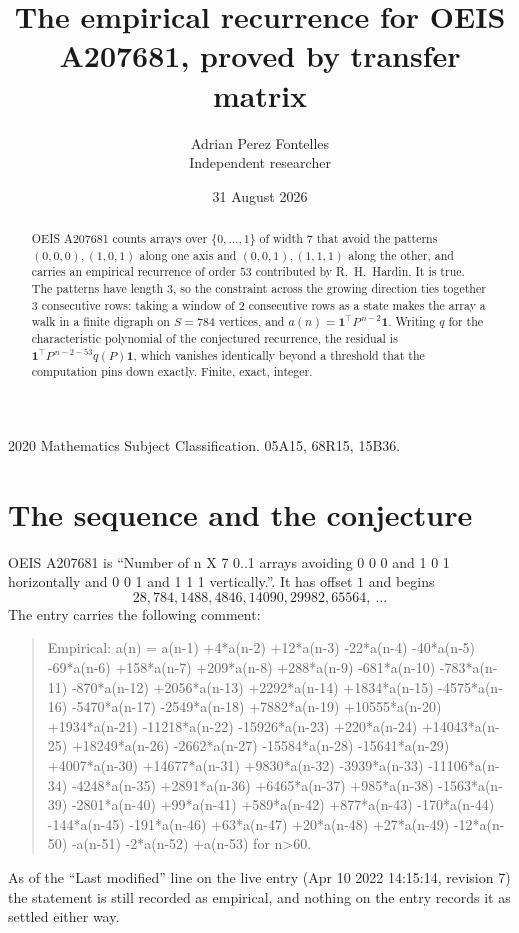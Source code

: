 \documentclass[11pt,a4paper]{article}
\title{The empirical recurrence for OEIS A207681, proved by transfer matrix}
\author{Adrian Perez Fontelles\\ \small Independent researcher}
\date{31 August 2026}
\theoremstyle{plain}
\theoremstyle{definition}
\begin{document}
\maketitle

\begin{abstract}
OEIS A207681 counts arrays over $\{0,\dots,1\}$ of width $7$ that avoid the patterns
$(0,0,0), (1,0,1)$ along one axis and $(0,0,1), (1,1,1)$ along the other, and carries an empirical recurrence of
order $53$ contributed by R.~H.~Hardin. It is true. The patterns have length $3$, so
the constraint across the growing direction ties together $3$ consecutive rows: taking a
window of $2$ consecutive rows as a state makes the array a walk in a finite digraph
on $S=784$ vertices, and $a(n)=\mathbf{1}^{\!\top}P^{\,n-2}\mathbf{1}$. Writing $q$
for the characteristic polynomial of the conjectured recurrence, the residual is
$\mathbf{1}^{\!\top}P^{\,n-2-53}q(P)\mathbf{1}$, which vanishes identically
beyond a threshold that the computation pins down exactly. Finite, exact, integer.
\end{abstract}

\noindent\small 2020 Mathematics Subject Classification. 05A15, 68R15, 15B36.\normalsize

\section{The sequence and the conjecture}

OEIS A207681 is ``Number of n X 7 0..1 arrays avoiding 0 0 0 and 1 0 1 horizontally and 0 0 1 and 1 1 1 vertically.''. It has offset
$1$ and begins
\[
28, 784, 1488, 4846, 14090, 29982, 65564,\ \dots
\]
The entry carries the following comment:
\begin{quote}\small
Empirical: a(n) = a(n-1) +4*a(n-2) +12*a(n-3) -22*a(n-4) -40*a(n-5) -69*a(n-6) +158*a(n-7) +209*a(n-8) +288*a(n-9) -681*a(n-10) -783*a(n-11) -870*a(n-12) +2056*a(n-13) +2292*a(n-14) +1834*a(n-15) -4575*a(n-16) -5470*a(n-17) -2549*a(n-18) +7882*a(n-19) +10555*a(n-20) +1934*a(n-21) -11218*a(n-22) -15926*a(n-23) +220*a(n-24) +14043*a(n-25) +18249*a(n-26) -2662*a(n-27) -15584*a(n-28) -15641*a(n-29) +4007*a(n-30) +14677*a(n-31) +9830*a(n-32) -3939*a(n-33) -11106*a(n-34) -4248*a(n-35) +2891*a(n-36) +6465*a(n-37) +985*a(n-38) -1563*a(n-39) -2801*a(n-40) +99*a(n-41) +589*a(n-42) +877*a(n-43) -170*a(n-44) -144*a(n-45) -191*a(n-46) +63*a(n-47) +20*a(n-48) +27*a(n-49) -12*a(n-50) -a(n-51) -2*a(n-52) +a(n-53) for n>60.
\end{quote}
As of the ``Last modified'' line on the live entry (Apr 10 2022 14:15:14, revision
7) the statement is still recorded as empirical, and nothing on the entry
records it as settled either way.
\end{document}
